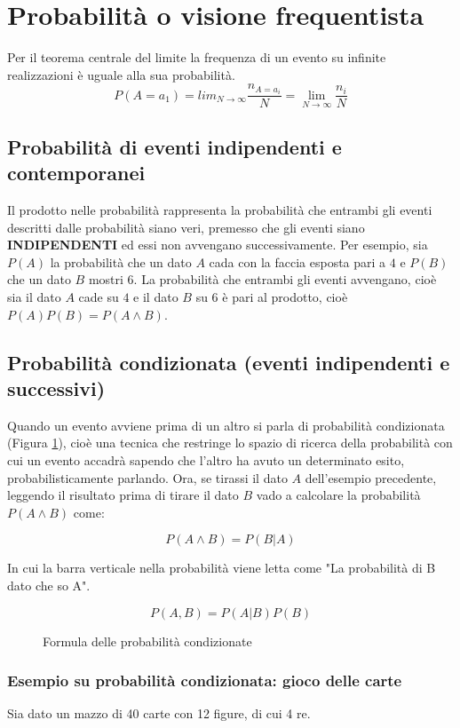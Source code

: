 \documentclass[\main/main.tex]{subfiles}
\begin{document}
\section{Probabilità o visione frequentista}
Per il teorema centrale del limite la frequenza di un evento su infinite realizzazioni è uguale alla sua probabilità.
\[
	P(A=a_1) = lim_{N\rightarrow \infty} \dfrac{n_{A=a_i}}{N} = \lim_{N\rightarrow \infty} \dfrac{n_i}{N}
\]

\subsection{Probabilità di eventi indipendenti e contemporanei}
Il prodotto nelle probabilità rappresenta la probabilità che entrambi gli eventi descritti dalle probabilità siano veri, premesso che gli eventi siano \textbf{INDIPENDENTI} ed essi non avvengano successivamente.
Per esempio, sia $P(A)$ la probabilità che un dato $A$ cada con la faccia esposta pari a $4$ e $P(B)$ che un dato $B$ mostri $6$. La probabilità che entrambi gli eventi avvengano, cioè sia il dato $A$ cade su $4$ e il dato $B$ su $6$ è pari al prodotto, cioè $P(A)P(B) = P(A \wedge B)$.

\subsection{Probabilità condizionata (eventi indipendenti e successivi)}
Quando un evento avviene prima di un altro si parla di probabilità condizionata (Figura \ref{probCond}), cioè una tecnica che restringe lo spazio di ricerca della probabilità con cui un evento accadrà sapendo che l'altro ha avuto un determinato esito, probabilisticamente parlando. Ora, se tirassi il dato $A$ dell'esempio precedente, leggendo il risultato prima di tirare il dato $B$ vado a calcolare la probabilità $P(A \wedge B)$ come:

\[
	P(A \wedge B) = P(B | A)
\]

In cui la barra verticale nella probabilità viene letta come "La probabilità di B dato che so A".

\begin{figure}[H]
\[
	P(A, B) = P(A|B) P(B)
\]
\caption{Formula delle probabilità condizionate}
\label{probCond}
\end{figure}

\subsubsection{Esempio su probabilità condizionata: gioco delle carte}
Sia dato un mazzo di 40 carte con 12 figure, di cui 4 re.
\end{document}
